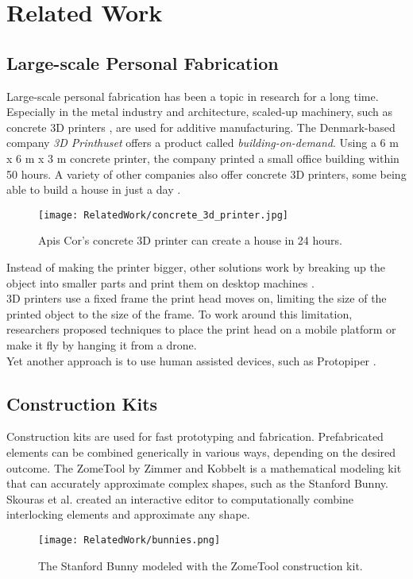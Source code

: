 \chapter{Related Work}\label{ch:relatedwork}
\section{Large-scale Personal Fabrication}
Large-scale personal fabrication has been a topic in research for a long time. Especially in the metal industry and architecture, scaled-up machinery, such as concrete 3D printers \cite{epstein:2003}, are used for additive manufacturing. The Denmark-based company \textit{3D Printhuset}\cite{printhuset} offers a product called \textit{building-on-demand}. Using a 6 m x 6 m x 3 m concrete printer, the company printed a small office building within 50 hours. A variety of other companies also offer concrete 3D printers, some being able to build a house in just a day \cite{apiscor}.\\
\begin{figure}[h!]
    \texttt{[image: RelatedWork/concrete\_3d\_printer.jpg]}
    \centering
    \caption{Apis Cor’s concrete 3D printer can create a house in 24 hours.}
    \label{fig:concrete_3d_printer}
\end{figure}
Instead of making the printer bigger, other solutions work by breaking up the object into smaller parts and print them on desktop machines \cite{lau:2011, luo:2012}.\\
3D printers use a fixed frame the print head moves on, limiting the size of the printed object to the size of the frame. To work around this limitation, researchers proposed techniques to place the print head on a mobile platform \cite{jokic:2016} or make it fly \cite{willmann:2012} by hanging it from a drone.\\
Yet another approach is to use human assisted devices, such as Protopiper \cite{agrawal:2015}.

\section{Construction Kits}
Construction kits are used for fast prototyping and fabrication. Prefabricated elements can be combined generically in various ways, depending on the desired outcome. The ZomeTool by Zimmer and Kobbelt \cite{zimmer:2014} is a mathematical modeling kit that can accurately approximate complex shapes, such as the Stanford Bunny. Skouras et al. \cite{skouras:2015} created an interactive editor to computationally combine interlocking elements and approximate any shape.
\begin{figure}[h!]
    \texttt{[image: RelatedWork/bunnies.png]}
    \centering
    \caption{The Stanford Bunny modeled with the ZomeTool construction kit.}
    \label{fig:bunnies}
\end{figure}

